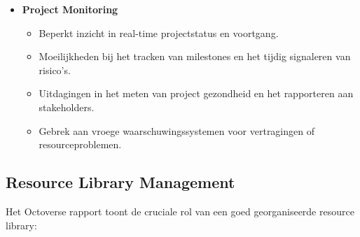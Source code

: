 \begin{itemize}
    \item \textbf{Project Monitoring}
    \begin{itemize}
        \item Beperkt inzicht in real-time projectstatus en voortgang.
        \item Moeilijkheden bij het tracken van milestones en het tijdig signaleren van risico's.
        \item Uitdagingen in het meten van project gezondheid en het rapporteren aan stakeholders.
        \item Gebrek aan vroege waarschuwingssystemen voor vertragingen of resourceproblemen.
    \end{itemize}
\end{itemize}

\subsection{Resource Library Management}
\label{subsec:resource-library}

Het \textcite{GitHub2023} Octoverse rapport toont de cruciale rol van een goed georganiseerde resource library:

